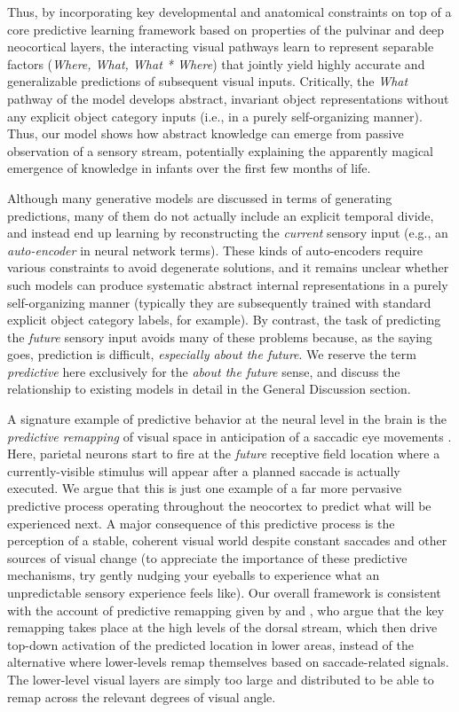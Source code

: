 \documentclass[11pt,twoside]{article}
\newif\myifpdf
\begin{document}
Thus, by incorporating key developmental and anatomical constraints on top of a core predictive learning framework based on properties of the pulvinar and deep neocortical layers, the interacting visual pathways learn to represent separable factors ({\em Where, What, What * Where}) that jointly yield highly accurate and generalizable predictions of subsequent visual inputs.  Critically, the {\em What} pathway of the model develops abstract, invariant object representations without any explicit object category inputs (i.e., in a purely self-organizing manner).  Thus, our model shows how abstract knowledge can emerge from passive observation of a sensory stream, potentially explaining the apparently magical emergence of knowledge in infants over the first few months of life.

Although many generative models are discussed in terms of generating predictions, many of them do not actually include an explicit temporal divide, and instead end up learning by reconstructing the {\em current} sensory input (e.g., an {\em auto-encoder} in neural network terms).  These kinds of auto-encoders require various constraints to avoid degenerate solutions, and it remains unclear whether such models can produce systematic abstract internal representations in a purely self-organizing manner (typically they are subsequently trained with standard explicit object category labels, for example).  By contrast, the task of predicting the {\em future} sensory input avoids many of these problems because, as the saying goes, prediction is difficult, {\em especially about the future}.  We reserve the term {\em predictive} here exclusively for the {\em about the future} sense, and discuss the relationship to existing models in detail in the General Discussion section.

A signature example of predictive behavior at the neural level in the brain is the {\em predictive remapping} of visual space in anticipation of a saccadic eye movements \cite{DuhamelColbyGoldberg92,ColbyDuhamelGoldberg97,GottliebKusunokiGoldberg98,NakamuraColby02,MarinoMazer16}.  Here, parietal neurons start to fire at the {\em future} receptive field location where a currently-visible stimulus will appear after a planned saccade is actually executed.  We argue that this is just one example of a far more pervasive predictive process operating throughout the neocortex to predict what will be experienced next.  A major consequence of this predictive process is the perception of a stable, coherent visual world despite constant saccades and other sources of visual change (to appreciate the importance of these predictive mechanisms, try gently nudging your eyeballs to experience what an unpredictable sensory experience feels like).  Our overall framework is consistent with the account of predictive remapping given by  and , who argue that the key remapping takes place at the high levels of the dorsal stream, which then drive top-down activation of the predicted location in lower areas, instead of the alternative where lower-levels remap themselves based on saccade-related signals.  The lower-level visual layers are simply too large and distributed to be able to remap across the relevant degrees of visual angle.
\end{document}
